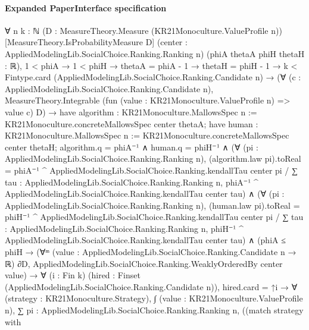 \documentclass[10pt]{article}
\begin{document}
\paragraph{Expanded PaperInterface specification}
\begin{ReviewVerbatim}
∀ {n k : ℕ} (D : MeasureTheory.Measure (KR21Monoculture.ValueProfile n)) [MeasureTheory.IsProbabilityMeasure D]
  (center : AppliedModelingLib.SocialChoice.Ranking.Ranking n) (phiA thetaA phiH thetaH : ℝ),
  1 < phiA →
    1 < phiH →
      thetaA = phiA - 1 →
        thetaH = phiH - 1 →
          k < Fintype.card (AppliedModelingLib.SocialChoice.Ranking.Candidate n) →
            (∀ (c : AppliedModelingLib.SocialChoice.Ranking.Candidate n),
                MeasureTheory.Integrable (fun (value : KR21Monoculture.ValueProfile n) => value c) D) →
              have algorithm : KR21Monoculture.MallowsSpec n := KR21Monoculture.concreteMallowsSpec center thetaA;
              have human : KR21Monoculture.MallowsSpec n := KR21Monoculture.concreteMallowsSpec center thetaH;
              algorithm.q = phiA⁻¹ ∧
                human.q = phiH⁻¹ ∧
                  (∀ (pi : AppliedModelingLib.SocialChoice.Ranking.Ranking n),
                      (algorithm.law pi).toReal =
                        phiA⁻¹ ^ AppliedModelingLib.SocialChoice.Ranking.kendallTau center pi /
                          ∑ tau : AppliedModelingLib.SocialChoice.Ranking.Ranking n,
                            phiA⁻¹ ^ AppliedModelingLib.SocialChoice.Ranking.kendallTau center tau) ∧
                    (∀ (pi : AppliedModelingLib.SocialChoice.Ranking.Ranking n),
                        (human.law pi).toReal =
                          phiH⁻¹ ^ AppliedModelingLib.SocialChoice.Ranking.kendallTau center pi /
                            ∑ tau : AppliedModelingLib.SocialChoice.Ranking.Ranking n,
                              phiH⁻¹ ^ AppliedModelingLib.SocialChoice.Ranking.kendallTau center tau) ∧
                      (phiA ≤ phiH →
                          (∀ᵐ (value : AppliedModelingLib.SocialChoice.Ranking.Candidate n → ℝ) ∂D,
                              AppliedModelingLib.SocialChoice.Ranking.WeaklyOrderedBy center value) →
                            ∀ (i : Fin k) (hired : Finset (AppliedModelingLib.SocialChoice.Ranking.Candidate n)),
                              hired.card = ↑i →
                                ∀ (strategy : KR21Monoculture.Strategy),
                                  ∫ (value : KR21Monoculture.ValueProfile n),
                                      ∑ pi : AppliedModelingLib.SocialChoice.Ranking.Ranking n,
                                        ((match strategy with

\end{ReviewVerbatim}
\end{document}
